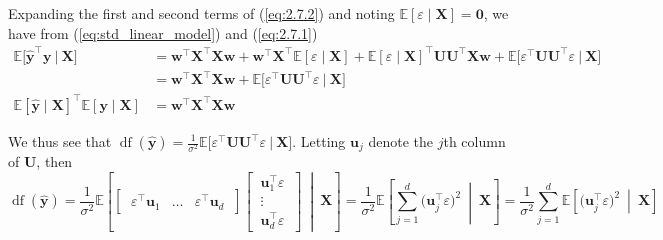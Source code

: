 \documentclass{article}
\numberwithin{equation}{section}
\begin{document}
Expanding the first and second terms of (\ref{eq:2.7.2}) and noting
$ \mathbb{E}[\varepsilon \mid \mathbf{X}] = \mathbf{0} $, we have from
(\ref{eq:std_linear_model}) and (\ref{eq:2.7.1})
\begin{equation*}
    \begin{split}
        \mathbb{E}\big[
            \hat{\mathbf{y}}^\top\mathbf{y} \ \big| \ \mathbf{X}
        \big] & =
        \mathbf{w}^\top\mathbf{X}^\top\mathbf{Xw} +
        \mathbf{w}^\top\mathbf{X}^\top
        \mathbb{E}[\varepsilon \mid \mathbf{X}] +
        \mathbb{E}[\varepsilon \mid \mathbf{X}]^\top
        \mathbf{UU}^\top\mathbf{Xw} +
        \mathbb{E}\big[
            \varepsilon^\top\mathbf{UU}^\top\varepsilon \ \big| \
            \mathbf{X}
        \big] \\ & =
        \mathbf{w}^\top\mathbf{X}^\top\mathbf{Xw} +
        \mathbb{E}\big[
            \varepsilon^\top\mathbf{UU}^\top\varepsilon \ \big| \
            \mathbf{X}
        \big] \\
        \mathbb{E}[\hat{\mathbf{y}} \mid \mathbf{X}]^\top
        \mathbb{E}[\mathbf{y} \mid \mathbf{X}] & =
        \mathbf{w}^\top\mathbf{X}^\top\mathbf{Xw}
    \end{split}
\end{equation*}

We thus see that $ \operatorname{df}(\hat{\mathbf{y}}) = \frac{1}{\sigma^2}
\mathbb{E}\big[\varepsilon^\top\mathbf{UU}^\top\varepsilon \ \big| \
\mathbf{X}\big] $. Letting $ \mathbf{u}_j $ denote the $ j $th column of
$ \mathbf{U} $, then
\begin{equation*}
    \operatorname{df}(\hat{\mathbf{y}}) =
    \frac{1}{\sigma^2}\mathbb{E}\left[
        \begin{bmatrix}
            \ \varepsilon^\top\mathbf{u}_1 &
            \ldots &
            \varepsilon^\top\mathbf{u}_d \
        \end{bmatrix}
        \begin{bmatrix}
            \ \mathbf{u}_1^\top\varepsilon \ \\
            \ \vdots \ \\
            \ \mathbf{u}_d^\top\varepsilon \
        \end{bmatrix}
        \ \middle\vert \ \mathbf{X}
    \right] =
    \frac{1}{\sigma^2}\mathbb{E}\left[
        \sum_{j = 1}^d\big(\mathbf{u}_j^\top\varepsilon\big)^2
        \ \middle\vert \ \mathbf{X}
    \right] =
    \frac{1}{\sigma^2}\sum_{j = 1}^d\mathbb{E}\left[
        \big(\mathbf{u}_j^\top\varepsilon\big)^2
        \ \middle\vert \ \mathbf{X}
    \right]
\end{equation*}
\end{document}

